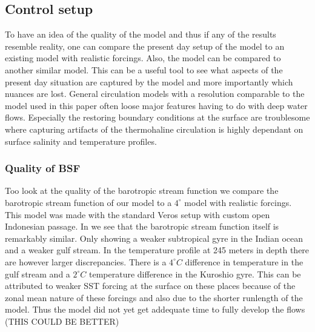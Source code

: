 \subsection{Control setup}

To have an idea of the quality of the model and thus if any of the results resemble reality, one can compare the present day setup of the model to an existing model with realistic forcings. Also, the model can be compared to another similar model. This can be a useful tool to see what aspects of the present day situation are captured by the model and more importantly which nuances are lost. General circulation models with a resolution comparable to the model used in this paper often loose major features having to do with deep water flows. Especially the restoring boundary conditions at the surface are troublesome where capturing artifacts of the thermohaline circulation is highly dependant on surface salinity and temperature profiles.


 


\subsubsection{Quality of BSF}
Too look at the quality of the barotropic stream function we compare the barotropic stream function of our model to a $4^{\circ}$ model with realistic forcings. This model was made with the standard Veros setup with custom open Indonesian passage. In  we see that the barotropic stream function itself is remarkably similar. Only showing a weaker subtropical gyre in the Indian ocean and a weaker gulf stream. In the temperature profile at 245 meters in depth there are however larger discrepancies. There is a $4^{\circ}C$ difference in temperature in the gulf stream and a $2^{\circ}C$ temperature difference in the Kuroshio gyre. This can be attributed to weaker SST forcing at the surface on these places because of the zonal mean nature of these forcings and also due to the shorter runlength of the model. Thus the model did not yet get addequate time to fully develop the flows (THIS COULD BE BETTER)


